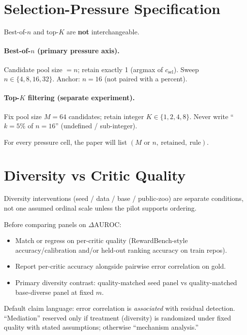 \documentclass[11pt]{article}
\newcommand{\DeltaAUROC}{\Delta\mathrm{AUROC}}
\begin{document}
\section{Selection-Pressure Specification}

Best-of-$n$ and top-$K$ are \textbf{not} interchangeable.

\paragraph{Best-of-$n$ (primary pressure axis).}
Candidate pool size $=n$; retain exactly 1 (argmax of $c_{\mathrm{sel}}$).
Sweep $n\in\{4,8,16,32\}$.
Anchor: $n{=}16$ (not paired with a percent).

\paragraph{Top-$K$ filtering (separate experiment).}
Fix pool size $M{=}64$ candidates; retain integer $K\in\{1,2,4,8\}$.
Never write ``$k{=}5\%$ of $n{=}16$'' (undefined / sub-integer).

For every pressure cell, the paper will list $(M\text{ or }n,\ \text{retained},\ \text{rule})$.

\section{Diversity vs Critic Quality}

Diversity interventions (seed / data / base / public-zoo) are separate conditions, not one assumed ordinal scale unless the pilot supports ordering.

Before comparing panels on $\DeltaAUROC$:
\begin{itemize}[leftmargin=*,itemsep=1pt]
  \item Match or regress on per-critic quality (RewardBench-style accuracy/calibration and/or held-out ranking accuracy on train repos).
  \item Report per-critic accuracy alongside pairwise error correlation on gold.
  \item Primary diversity contrast: quality-matched seed panel vs quality-matched base-diverse panel at fixed $m$.
\end{itemize}
Default claim language: error correlation is \emph{associated} with residual detection.
``Mediation'' reserved only if treatment (diversity) is randomized under fixed quality with stated assumptions; otherwise ``mechanism analysis.''
\end{document}
